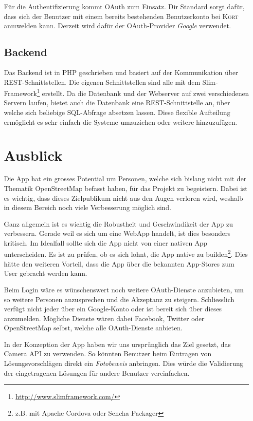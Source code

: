 Für die Authentifizierung kommt \gls{OAuth} zum Einsatz.
Dir Standard sorgt dafür, dass sich der Benutzer mit einem bereits bestehenden Benutzerkonto bei \textsc{Kort} anmwelden kann.
Derzeit wird dafür der OAuth-Provider \emph{Google} verwendet.

\subsection*{Backend}
Das Backend ist in PHP geschrieben und basiert auf der Kommunikation über \gls{REST}-Schnittstellen.
Die eigenen Schnittstellen sind alle mit dem Slim-Framework\footnote{\url{http://www.slimframework.com/}} erstellt.
Da die Datenbank und der Webserver auf zwei verschiedenen Servern laufen, bietet auch die Datenbank eine REST-Schnittstelle an, über welche sich beliebige SQL-Abfrage absetzen lassen.
Diese flexible Aufteilung ermöglicht es sehr einfach die Systeme umzuziehen oder weitere hinzuzufügen.

\section*{Ausblick}
Die App hat ein grosses Potential um Personen, welche sich bislang nicht mit der Thematik OpenStreetMap befasst haben, für das Projekt zu begeistern. 
Dabei ist es wichtig, dass dieses Zielpublikum nicht aus den Augen verloren wird, weshalb in diesem Bereich noch viele Verbesserung möglich sind.

Ganz allgemein ist es wichtig die Robustheit und Geschwindikeit der App zu verbessern. 
Gerade weil es sich um eine \gls{WebApp} handelt, ist dies besonders kritisch. 
Im Idealfall sollte sich die App nicht von einer nativen App unterscheiden.
Es ist zu prüfen, ob es sich lohnt, die App native zu builden\footnote{z.B. mit Apache Cordova oder Sencha Packager}.
Dies hätte den weiteren Vorteil, dass die App über die bekannten \gls{App-Store}s zum User gebracht werden kann.

Beim Login wäre es wünschenswert noch weitere \gls{OAuth}-Dienste anzubieten, um so weitere Personen anzusprechen und die Akzeptanz zu steigern.
Schliesslich verfügt nicht jeder über ein Google-Konto oder ist bereit sich über dieses anzumelden.
Mögliche Dienste wären dabei Facebook, Twitter oder OpenStreetMap selbst, welche alle \gls{OAuth}-Dienste anbieten.

In der Konzeption der App haben wir uns ursprünglich das Ziel gesetzt, das \gls{Camera API} zu verwenden. 
So könnten Benutzer beim Eintragen von Lösungsvorschlägen direkt ein \emph{Fotobeweis} anbringen. 
Dies würde die Validierung der eingetragenen Lösungen für andere Benutzer vereinfachen.

